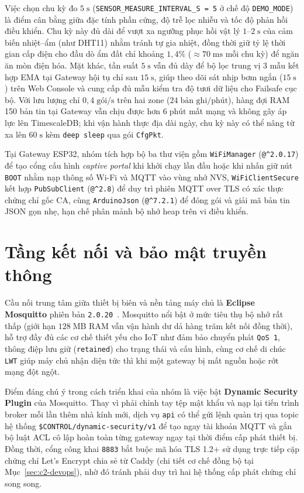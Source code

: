 Việc chọn chu kỳ đo \(5\;\text{s}\) (\texttt{SENSOR\_MEASURE\_INTERVAL\_S = 5} ở chế độ \texttt{DEMO\_MODE}) là điểm cân bằng giữa đặc tính phần cứng, độ trễ lọc nhiễu và tốc độ phản hồi điều khiển. Chu kỳ này đủ dài để vượt xa ngưỡng phục hồi vật lý \(1\text{--}2\;\text{s}\) của cảm biến nhiệt--ẩm (như DHT11) nhằm tránh tự gia nhiệt, đồng thời giữ tỷ lệ thời gian cấp điện cho đầu dò ẩm đất chỉ khoảng \(1{,}4\%\) (\(\approx 70\;\text{ms}\) mỗi chu kỳ) để ngăn ăn mòn điện hóa. Mặt khác, tần suất \(5\;\text{s}\) vẫn đủ dày để bộ lọc trung vị 3 mẫu kết hợp EMA tại Gateway hội tụ chỉ sau \(15\;\text{s}\), giúp theo dõi sát nhịp bơm ngắn (\(15\;\text{s}\)) trên Web Console và cung cấp đủ mẫu kiểm tra độ tươi dữ liệu cho Failsafe cục bộ. Với lưu lượng chỉ \(0{,}4\;\text{gói/s}\) trên hai zone (\(24\;\text{bản ghi/phút}\)), hàng đợi RAM 150 bản tin tại Gateway vẫn chịu được hơn \(6\;\text{phút}\) mất mạng và không gây áp lực lên TimescaleDB; khi vận hành thực địa dài ngày, chu kỳ này có thể nâng từ xa lên \(60\;\text{s}\) kèm \texttt{deep sleep} qua gói \texttt{CfgPkt}.

Tại Gateway ESP32, nhóm tích hợp bộ ba thư viện gồm \texttt{WiFiManager} (\texttt{@\textasciicircum 2.0.17}) để tạo cổng cấu hình \textit{captive portal} khi khởi chạy lần đầu hoặc khi nhấn giữ nút \texttt{BOOT} nhằm nạp thông số Wi-Fi và MQTT vào vùng nhớ NVS, \texttt{WiFiClientSecure} kết hợp \texttt{PubSubClient} (\texttt{@\textasciicircum 2.8}) để duy trì phiên MQTT over TLS có xác thực chứng chỉ gốc CA, cùng \texttt{ArduinoJson} (\texttt{@\textasciicircum 7.2.1}) để đóng gói và giải mã bản tin JSON gọn nhẹ, hạn chế phân mảnh bộ nhớ heap trên vi điều khiển.

\section{Tầng kết nối và bảo mật truyền thông}
\label{sec:c2-connectivity}

Cầu nối trung tâm giữa thiết bị biên và nền tảng máy chủ là \textbf{Eclipse Mosquitto} phiên bản \texttt{2.0.20}~\cite{mosquittoDocs}. Mosquitto nổi bật ở mức tiêu thụ bộ nhớ rất thấp (giới hạn \(128\;\text{MB}\) RAM vẫn vận hành dư dả hàng trăm kết nối đồng thời), hỗ trợ đầy đủ các cơ chế thiết yếu cho IoT như đảm bảo chuyển phát \texttt{QoS 1}, thông điệp lưu giữ (\texttt{retained}) cho trạng thái và cấu hình, cùng cơ chế di chúc \texttt{LWT} giúp máy chủ nhận diện tức thì khi một gateway bị mất nguồn hoặc rớt mạng đột ngột.

Điểm đáng chú ý trong cách triển khai của nhóm là việc bật \textbf{Dynamic Security Plugin} của Mosquitto. Thay vì phải chỉnh tay tệp mật khẩu và nạp lại tiến trình broker mỗi lần thêm nhà kính mới, dịch vụ \texttt{api} có thể gửi lệnh quản trị qua topic hệ thống \texttt{\$CONTROL/dynamic-security/v1} để tạo ngay tài khoản MQTT và gắn bộ luật ACL cô lập hoàn toàn từng gateway ngay tại thời điểm cấp phát thiết bị. Đồng thời, cổng công khai \texttt{8883} bắt buộc mã hóa TLS 1.2+ sử dụng trực tiếp cặp chứng chỉ Let's Encrypt chia sẻ từ Caddy (chi tiết cơ chế đồng bộ tại Mục~\ref{sec:c2-devops}), nhờ đó tránh phải duy trì hai hệ thống cấp phát chứng chỉ song song.

